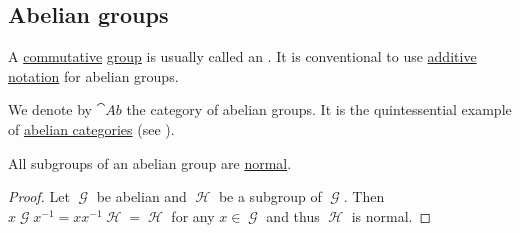 \subsection{Abelian groups}\label{subsec:abelian_groups}

\begin{definition}\label{def:abelian_group}
  A \hyperref[def:magma/commutative]{commutative} \hyperref[def:group]{group} is usually called an . It is conventional to use \hyperref[rem:additive_magma]{additive notation} for abelian groups.

  We denote by \( \cat{Ab} \) the category of abelian groups. It is the quintessential example of \hyperref[def:abelian_category]{abelian categories} (see ).
\end{definition}

\begin{proposition}\label{thm:abelian_normal_subgroups}
  All subgroups of an abelian group are \hyperref[def:normal_subgroup]{normal}.
\end{proposition}
\begin{proof}
  Let \( \mscrG \) be abelian and \( \mscrH \) be a subgroup of \( \mscrG \). Then \( x \mscrG x^{-1} = xx^{-1} \mscrH = \mscrH \) for any \( x \in \mscrG \) and thus \( \mscrH \) is normal.
\end{proof}

